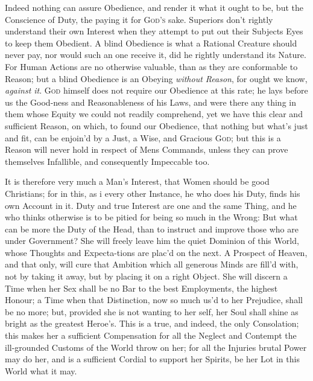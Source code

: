 Indeed nothing can assure Obedience, and render it what it ought to
be, but the Conscience of Duty, the paying it for \textsc{God's} sake.
Superiors don't rightly understand their own Interest when they
attempt to put out their Subjects Eyes to keep them Obedient. A blind
Obedience is what a Rational Creature should never pay, nor would such
an one receive it, did he rightly understand its Nature. For Human
Actions are no otherwise valuable, than as they are conformable to
Reason; but a blind Obedience is an Obeying \textit{without Reason},
for ought we know, \textit{against it}. \textsc{God} himself does not
require our Obedience at this rate; he lays before us the
Good-ness and Reasonableness of his Laws, and were there any
thing in them whose Equity we could not readily comprehend, yet we
have this clear and sufficient Reason, on which, to found our
Obedience, that nothing but what's just and fit, can be enjoin'd by a
Just, a Wise, and Gracious \textsc{God}; but this is a Reason will
never hold in respect of Mens Commands, unless they can prove
themselves Infallible, and consequently Impeccable too.

It is therefore very much a Man's Interest, that Women should be good
Christians; for in this, as i every other Instance, he who does his
Duty, finds his own Account in it. Duty and true Interest are one and
the same Thing, and he who thinks otherwise is to be pitied for being
so much in the Wrong: But what can be more the Duty of the Head, than
to instruct and improve those who are under Government? She will
freely leave him the quiet Dominion of this World, whose Thoughts and
Expecta-tions are plac'd on the next. A Prospect of Heaven,
and that only, will cure that Ambition which all generous Minds are
fill'd with, not by taking it away, but by placing it on a right
Object. She will discern a Time when her Sex shall be no Bar to the
best Employments, the highest Honour; a Time when that Distinction,
now so much us'd to her Prejudice, shall be no more; but, provided she
is not wanting to her self, her Soul shall shine as bright as the
greatest Heroe's. This is a true, and indeed, the only Consolation;
this makes her a sufficient Compensation for all the Neglect and
Contempt the ill-grounded Customs of the World throw on her; for all
the Injuries brutal Power may do her, and is a sufficient Cordial to
support her Spirits, be her Lot in this World what it may.

